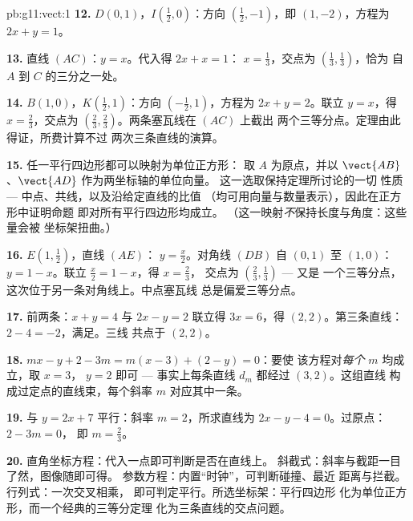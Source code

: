 \begin{solution}{pb:g11:vect:1}
\textbf{12.} $D(0, 1)$，$I\left(\frac12, 0\right)$：方向
$\left(\frac12, -1\right)$，即 $(1, -2)$，方程为
$2x + y = 1$。

\textbf{13.} 直线 $(AC)$：$y = x$。代入得 $2x + x = 1$：
$x = \frac13$，交点为 $\left(\frac13, \frac13\right)$，恰为
自 $A$ 到 $C$ 的三分之一处。

\textbf{14.} $B(1, 0)$，$K\left(\frac12, 1\right)$：方向
$\left(-\frac12, 1\right)$，方程为 $2x + y = 2$。联立
$y = x$，得 $x = \frac23$，交点为
$\left(\frac23, \frac23\right)$。两条塞瓦线在 $(AC)$ 上截出
两个三等分点。定理由此得证，所费计算不过
两次三条直线的演算。

\textbf{15.} 任一平行四边形都可以映射为单位正方形：
取 $A$ 为原点，并以 $\vect{AB}$、$\vect{AD}$ 作为两坐标轴的单位向量。
这一选取保持定理所讨论的一切
性质 --- 中点、共线，以及沿给定直线的比值
（均可用向量与数量表示），因此在正方形中证明命题
即对所有平行四边形均成立。
（这一映射\emph{不}保持长度与角度：这些量会被
坐标架扭曲。）

\textbf{16.} $E\left(1, \frac12\right)$，直线 $(AE)$：
$y = \frac x2$。对角线 $(DB)$ 自 $(0,1)$ 至 $(1,0)$：
$y = 1 - x$。联立 $\frac x2 = 1 - x$，得 $x = \frac23$，
交点为 $\left(\frac23, \frac13\right)$ --- 又是
一个三等分点，这次位于另一条对角线上。中点塞瓦线
总是偏爱三等分点。

\textbf{17.} 前两条：$x + y = 4$ 与 $2x - y = 2$ 联立得
$3x = 6$，得 $(2, 2)$。第三条直线：$2 - 4 = -2$，满足。三线
共点于 $(2, 2)$。

\textbf{18.} $mx - y + 2 - 3m = m(x - 3) + (2 - y) = 0$：要使
该方程对\emph{每个} $m$ 均成立，取 $x = 3$，
$y = 2$ 即可 --- 事实上每条直线 $d_m$ 都经过 $(3, 2)$。这组直线
构成过定点的直线束，每个斜率 $m$ 对应其中一条。

\textbf{19.} 与 $y = 2x + 7$ 平行：斜率 $m = 2$，所求直线为
$2x - y - 4 = 0$。过原点：$2 - 3m = 0$，
即 $m = \frac23$。

\textbf{20.} 直角坐标方程：代入一点即可判断是否在直线上。
斜截式：斜率与截距一目了然，图像随即可得。
参数方程：内置“时钟”，可判断碰撞、最近
距离与拦截。行列式：一次交叉相乘，
即可判定平行。所选坐标架：平行四边形
化为单位正方形，而一个经典的三等分定理
化为三条直线的交点问题。
\end{solution}
